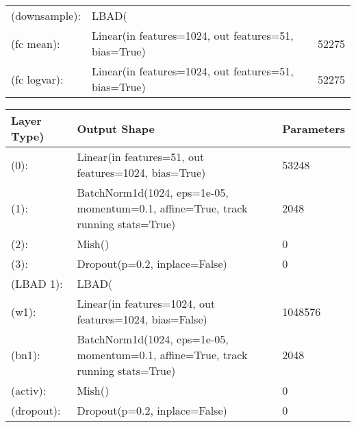 \begin{center}
\begin{tabular}{ p{}| p{}| p{}}
        (downsample):        & LBAD(                                                   &                     \\

        (fc mean):           & Linear(in features=1024, out features=51, bias=True)    & 52275               \\
        (fc logvar):         & Linear(in features=1024, out features=51, bias=True)    & 52275               \\
    \end{tabular}
\end{center}

\begin{center}
    \begin{tabular}{ p{}| p{}| p{}}

        \textbf{Layer Type)} & \textbf{Output Shape}                                                             & \textbf{Parameters} \\
        \hline

        (0):                 & Linear(in features=51, out features=1024, bias=True)                              & 53248               \\
        (1):                 & BatchNorm1d(1024, eps=1e-05, momentum=0.1, affine=True, track running stats=True) & 2048                \\
        (2):                 & Mish()                                                                            & 0                   \\
        (3):                 & Dropout(p=0.2, inplace=False)                                                     & 0                   \\

        (LBAD 1):            & LBAD(                                                                             &                     \\
        (w1):                & Linear(in features=1024, out features=1024, bias=False)                           & 1048576             \\
        (bn1):               & BatchNorm1d(1024, eps=1e-05, momentum=0.1, affine=True, track running stats=True) & 2048                \\
        (activ):             & Mish()                                                                            & 0                   \\
        (dropout):           & Dropout(p=0.2, inplace=False)                                                     & 0                   \\


\end{tabular}
\end{center}
